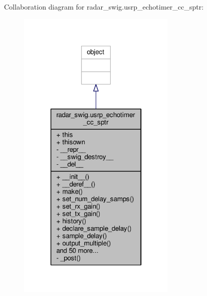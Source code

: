 Collaboration diagram for radar\+\_\+swig.\+usrp\+\_\+echotimer\+\_\+cc\+\_\+sptr\+:
\nopagebreak
\begin{figure}[H]
\begin{center}
\leavevmode
\includegraphics[width=214pt]{dc/d89/classradar__swig_1_1usrp__echotimer__cc__sptr__coll__graph}
\end{center}
\end{figure}
